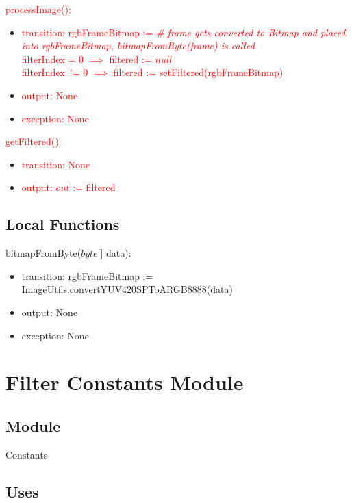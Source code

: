\documentclass[12pt, titlepage]{article}
\begin{document}
\noindent \textcolor{red}{processImage():}
\begin{itemize}
\item \textcolor{red}{transition: rgbFrameBitmap := \textit{\# frame gets converted to Bitmap and placed into rgbFrameBitmap, bitmapFromByte(frame) is called}  \\
filterIndex = 0 $\implies$ filtered := $null$ \\
filterIndex\ != 0 $\implies$ filtered := setFiltered(rgbFrameBitmap)
}

\item \textcolor{red}{output: None}
\item \textcolor{red}{exception: None}
\end{itemize}

\noindent \textcolor{red}{getFiltered():}
\begin{itemize}
\item \textcolor{red}{transition: None}
\item \textcolor{red}{output: $out$ := filtered}
\end{itemize}

\subsection*{Local Functions}

\noindent bitmapFromByte($byte$[] data):
\begin{itemize}
\item transition: rgbFrameBitmap := ImageUtils.convertYUV420SPToARGB8888(data)
\item output: None
\item exception: None\\
\end{itemize}

\newpage

\section* {Filter Constants Module}

\subsection*{Module}

Constants

\subsection* {Uses}
\end{document}
